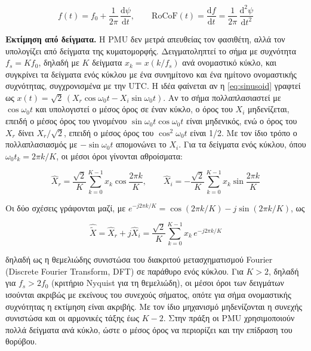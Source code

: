\begin{equation}
f(t) = f_0 + \frac{1}{2\pi}\,\frac{\mathrm{d}\psi}{\mathrm{d}t}, \qquad
\mathrm{RoCoF}(t) = \frac{\mathrm{d}f}{\mathrm{d}t}
= \frac{1}{2\pi}\,\frac{\mathrm{d}^2\psi}{\mathrm{d}t^2}
\label{eq:pmufreq}
\end{equation}

\textbf{Εκτίμηση από δείγματα.} Η PMU δεν μετρά απευθείας τον φασιθέτη, αλλά τον υπολογίζει
από δείγματα της κυματομορφής. Δειγματοληπτεί το σήμα με συχνότητα $f_s = K f_0$, δηλαδή με
$K$ δείγματα $x_k = x(k/f_s)$ ανά ονομαστικό κύκλο, και συγκρίνει τα δείγματα ενός κύκλου με
ένα συνημίτονο και ένα ημίτονο ονομαστικής συχνότητας, συγχρονισμένα με την UTC. Η ιδέα
φαίνεται αν η \eqref{eq:sinusoid} γραφτεί ως
$x(t) = \sqrt{2}\,(X_r \cos\omega_0 t - X_i \sin\omega_0 t)$. Αν το σήμα πολλαπλασιαστεί με
$\cos\omega_0 t$ και υπολογιστεί ο μέσος όρος σε έναν κύκλο, ο όρος του $X_i$ μηδενίζεται,
επειδή ο μέσος όρος του γινομένου $\sin\omega_0 t \cos\omega_0 t$ είναι μηδενικός, ενώ ο όρος
του $X_r$ δίνει $X_r/\sqrt{2}$, επειδή ο μέσος όρος του $\cos^2\omega_0 t$ είναι 1/2. Με τον
ίδιο τρόπο ο πολλαπλασιασμός με $-\sin\omega_0 t$ απομονώνει το $X_i$. Για τα δείγματα ενός
κύκλου, όπου $\omega_0 t_k = 2\pi k/K$, οι μέσοι όροι γίνονται αθροίσματα:

\begin{equation}
\hat{X}_r = \frac{\sqrt{2}}{K}\sum_{k=0}^{K-1} x_k \cos\frac{2\pi k}{K}, \qquad
\hat{X}_i = -\frac{\sqrt{2}}{K}\sum_{k=0}^{K-1} x_k \sin\frac{2\pi k}{K}
\label{eq:dftparts}
\end{equation}

Οι δύο σχέσεις γράφονται μαζί, με $e^{-j2\pi k/K} = \cos(2\pi k/K) - j\sin(2\pi k/K)$, ως

\begin{equation}
\hat{\tilde{X}} = \hat{X}_r + j\hat{X}_i
= \frac{\sqrt{2}}{K} \sum_{k=0}^{K-1} x_k\, e^{-j 2\pi k / K}
\label{eq:dft}
\end{equation}

δηλαδή ως η θεμελιώδης συνιστώσα του διακριτού μετασχηματισμού Fourier (Discrete Fourier
Transform, DFT) σε παράθυρο ενός κύκλου. Για $K > 2$, δηλαδή για $f_s > 2f_0$ (κριτήριο Nyquist για τη
θεμελιώδη), οι μέσοι όροι των δειγμάτων ισούνται ακριβώς με εκείνους του συνεχούς σήματος, οπότε για σήμα ονομαστικής συχνότητας η εκτίμηση
είναι ακριβής. Με τον ίδιο μηχανισμό μηδενίζονται η συνεχής συνιστώσα και οι αρμονικές τάξης
έως $K-2$. Στην πράξη οι PMU χρησιμοποιούν πολλά δείγματα ανά κύκλο, ώστε ο μέσος όρος να
περιορίζει και την επίδραση του θορύβου.

